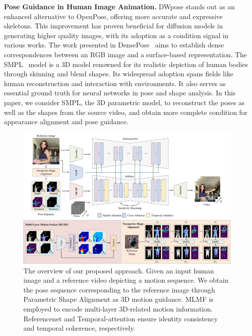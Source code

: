 \textbf{Pose Guidance in Human Image Animation.}
DWpose\cite{yang2023effective} stands out as an enhanced alternative to OpenPose\cite{cao2017realtime}, offering more accurate and expressive skeletons. 
This improvement has proven beneficial for diffusion models in generating higher quality images, with its adoption as a condition signal in various works\cite{feng2023dreamoving,hu2023animate}.
The work presented in DensePose~\cite{Guler2018DensePose} aims to establish dense correspondences between an RGB image and a surface-based representation.
The SMPL~\cite{SMPL:2015} model is a 3D model renowned for its realistic depiction of human bodies through skinning and blend shapes.
Its widespread adoption spans fields like human reconstruction\cite{he2021arch,alldieck2018video} and interaction with environments\cite{hassan2021populating,ma2020learning}. 
It also serves as essential ground truth for neural networks in pose and shape analysis\cite{lu2023dposer,mu2023actorsnerf}.
In this paper, we consider SMPL, the 3D parametric model, to reconstruct the poses as well as the shapes from the source video, and obtain more complete condition for appearance alignment and pose guidance.

\begin{figure}[t]
  \centering
  \includegraphics[width=0.95\linewidth]{fig/framework.jpg}
  \caption{The overview of our proposed approach. Given an input human image and a reference video depicting a motion sequence. We obtain the pose sequence corresponding to the reference image through Parametric Shape Alignment as 3D motion guidance. MLMF is employed to encode multi-layer 3D-related motion information. Referencenet and Temporal-attention ensure identity consistency and temporal coherence, respectively.}
  \vspace{-6mm}
  \label{fig:network}
\end{figure}